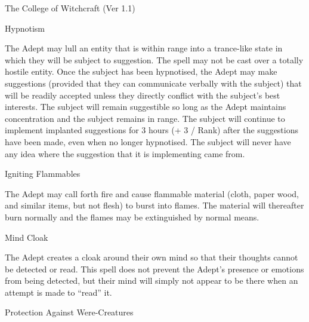 \begin{Chapter}{The College of Witchcraft (Ver 1.1)}
\begin{spell}[G-6]{Hypnotism}
\begin{effects}
The Adept may lull an entity that is within range into a trance-like
state in which they will be subject to suggestion.  The spell may not
be cast over a totally hostile entity.  Once the subject has been
hypnotised, the Adept may make suggestions (provided that they can
communicate verbally with the subject) that will be readily accepted
unless they directly conflict with the subject’s best interests.  The
subject will remain suggestible so long as the Adept maintains
concentration and the subject remains in range.  The subject will
continue to implement implanted suggestions for 3 hours (+ 3 / Rank)
after the suggestions have been made, even when no longer hypnotised.
The subject will never have any idea where the suggestion that it is
implementing came from.
\end{effects}
\end{spell}

\begin{spell}[G-7]{Igniting Flammables}

\begin{effects}
The Adept may call forth fire and cause flammable material (cloth,
paper wood, and similar items, but not flesh) to burst into flames.
The material will thereafter burn normally and the flames may be
extinguished by normal means.
\end{effects}
\end{spell}

\begin{spell}[G-8]{Mind Cloak}

\begin{effects}
The Adept creates a cloak around their own mind so that their thoughts
cannot be detected or read.  This spell does not prevent the Adept’s
presence or emotions from being detected, but their mind will simply
not appear to be there when an attempt is made to “read” it.
\end{effects}
\end{spell}

\begin{spell}[G-9]{Protection Against Were-Creatures}


\end{spell}
\end{Chapter}
